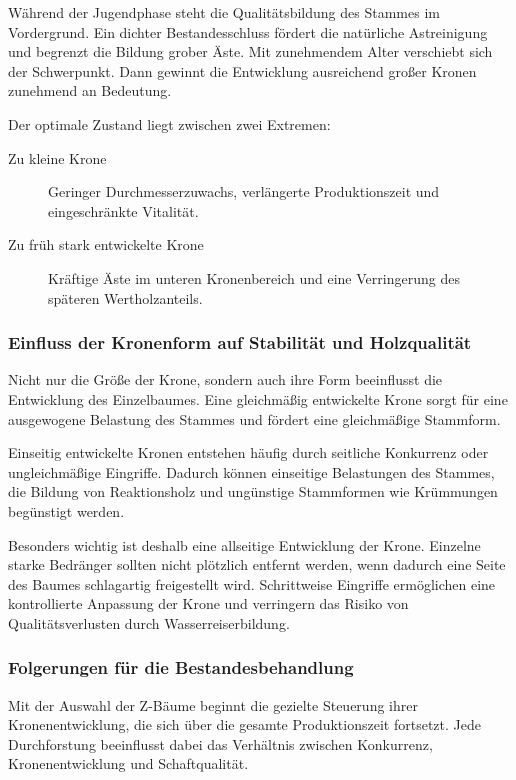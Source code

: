 \documentclass[twocolumn, bibliography=totoc, abstract=true]{scrartcl}
\begin{document}
Während der Jugendphase steht die Qualitätsbildung des Stammes im Vordergrund. Ein dichter Bestandesschluss fördert die natürliche Astreinigung und begrenzt die Bildung grober Äste. Mit zunehmendem Alter verschiebt sich der Schwerpunkt. Dann gewinnt die Entwicklung ausreichend großer Kronen zunehmend an Bedeutung.

Der optimale Zustand liegt zwischen zwei Extremen:

\begin{description}
\item[Zu kleine Krone] Geringer Durchmesserzuwachs, verlängerte Produktionszeit und eingeschränkte Vitalität.
\item[Zu früh stark entwickelte Krone] Kräftige Äste im unteren Kronenbereich und eine Verringerung des späteren Wertholzanteils.
\end{description}

\subsubsection{Einfluss der Kronenform auf Stabilität und Holzqualität}

Nicht nur die Größe der Krone, sondern auch ihre Form beeinflusst die Entwicklung des Einzelbaumes. Eine gleichmäßig entwickelte Krone sorgt für eine ausgewogene Belastung des Stammes und fördert eine gleichmäßige Stammform.

Einseitig entwickelte Kronen entstehen häufig durch seitliche Konkurrenz oder ungleichmäßige Eingriffe. Dadurch können einseitige Belastungen des Stammes, die Bildung von Reaktionsholz und ungünstige Stammformen wie Krümmungen begünstigt werden.

Besonders wichtig ist deshalb eine allseitige Entwicklung der Krone. Einzelne starke Bedränger sollten nicht plötzlich entfernt werden, wenn dadurch eine Seite des Baumes schlagartig freigestellt wird. Schrittweise Eingriffe ermöglichen eine kontrollierte Anpassung der Krone und verringern das Risiko von Qualitätsverlusten durch Wasserreiserbildung.

\subsubsection{Folgerungen für die Bestandesbehandlung}

Mit der Auswahl der Z-Bäume beginnt die gezielte Steuerung ihrer Kronenentwicklung, die sich über die gesamte Produktionszeit fortsetzt. Jede Durchforstung beeinflusst dabei das Verhältnis zwischen Konkurrenz, Kronenentwicklung und Schaftqualität.
\end{document}
